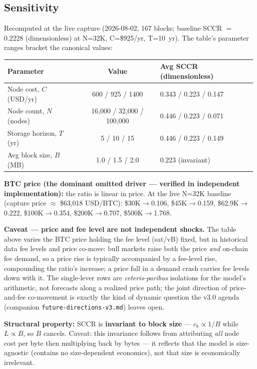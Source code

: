 \documentclass[11pt]{article}
\begin{document}
\subsection{Sensitivity}\label{sec:5.3}
Recomputed at the live capture (2026-08-02, 167 blocks; baseline SCCR $=$ 0.2228 (dimensionless) at N=32K, C=\$925/yr, T=10~yr). The table's parameter ranges bracket the canonical values:
\begin{center}
\renewcommand{\arraystretch}{1.2}
\begin{tabular}{lcl}
\toprule
Parameter & Value & Avg SCCR (dimensionless) \\
\midrule
Node cost, $C$ (USD/yr) & 600 / 925 / 1400 & 0.343 / 0.223 / 0.147 \\
Node count, $N$ (nodes) & 16{,}000 / 32{,}000 / 100{,}000 & 0.446 / 0.223 / 0.071 \\
Storage horizon, $T$ (yr) & 5 / 10 / 15 & 0.446 / 0.223 / 0.149 \\
Avg block size, $B$ (MB) & 1.0 / 1.5 / 2.0 & 0.223 (invariant) \\
\bottomrule
\end{tabular}
\end{center}
\textbf{BTC price (the dominant omitted driver --- verified in independent implementation):} the ratio is linear in price. At the live N=32K baseline (capture price $\approx$ \$63{,}018 USD/BTC): \$30K$\rightarrow$0.106, \$45K$\rightarrow$0.159, \$62.9K$\rightarrow$0.222, \$100K$\rightarrow$0.354, \$200K$\rightarrow$0.707, \$500K$\rightarrow$1.768.

\textbf{Caveat --- price and fee level are not independent shocks.} The table above varies the BTC price holding the fee level (sat/vB) fixed, but in historical data fee levels and price co-move: bull markets raise both the price \emph{and} on-chain fee demand, so a price rise is typically accompanied by a fee-level rise, compounding the ratio's increase; a price fall in a demand crash carries fee levels down with it. The single-lever rows are \emph{ceteris-paribus} isolations for the model's arithmetic, not forecasts along a realized price path; the joint direction of price-and-fee co-movement is exactly the kind of dynamic question the v3.0 agenda (companion \texttt{future-directions-v3.md}) leaves open.

\textbf{Structural property:} SCCR is \textbf{invariant to block size} --- $c_b \propto 1/B$ while $L \propto B$, so $B$ cancels. Caveat: this invariance follows from attributing \emph{all} node cost per byte then multiplying back by bytes --- it reflects that the model is size-agnostic (contains no size-dependent economics), not that size is economically irrelevant.
\end{document}
